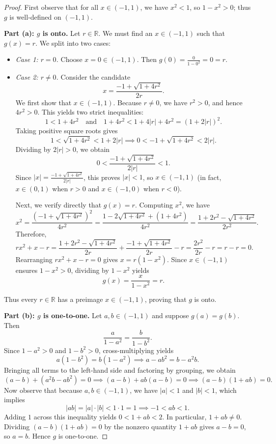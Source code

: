 \documentclass[11pt, letterpaper]{article}
\theoremstyle{definition}
\theoremstyle{remark}
\begin{document}
\begin{proof}
First observe that for all $x \in (-1, 1)$, we have $x^2 < 1$, so $1 - x^2 > 0$; thus $g$ is well-defined on $(-1, 1)$.

\textbf{Part (a): $g$ is onto.}
Let $r \in \mathbb{R}$. We must find an $x \in (-1, 1)$ such that $g(x) = r$. We split into two cases:
\begin{itemize}
    \item \emph{Case 1: $r = 0$.} Choose $x = 0 \in (-1, 1)$. Then $g(0) = \frac{0}{1 - 0^2} = 0 = r$.
    \item \emph{Case 2: $r \neq 0$.} Consider the candidate
    \[
    x = \frac{-1 + \sqrt{1 + 4r^2}}{2r}.
    \]
    We first show that $x \in (-1, 1)$. Because $r \neq 0$, we have $r^2 > 0$, and hence $4r^2 > 0$. This yields two strict inequalities:
    \[
    1 < 1 + 4r^2 \quad \text{and} \quad 1 + 4r^2 < 1 + 4|r| + 4r^2 = (1 + 2|r|)^2.
    \]
    Taking positive square roots gives
    \[
    1 < \sqrt{1 + 4r^2} < 1 + 2|r| \implies 0 < -1 + \sqrt{1 + 4r^2} < 2|r|.
    \]
    Dividing by $2|r| > 0$, we obtain
    \[
    0 < \frac{-1 + \sqrt{1 + 4r^2}}{2|r|} < 1.
    \]
    Since $|x| = \frac{-1 + \sqrt{1 + 4r^2}}{2|r|}$, this proves $|x| < 1$, so $x \in (-1, 1)$ (in fact, $x \in (0, 1)$ when $r > 0$ and $x \in (-1, 0)$ when $r < 0$).

    Next, we verify directly that $g(x) = r$. Computing $x^2$, we have
    \[
    x^2 = \frac{(-1 + \sqrt{1 + 4r^2})^2}{4r^2} = \frac{1 - 2\sqrt{1 + 4r^2} + (1 + 4r^2)}{4r^2} = \frac{1 + 2r^2 - \sqrt{1 + 4r^2}}{2r^2}.
    \]
    Therefore,
    \[
    rx^2 + x - r = \frac{1 + 2r^2 - \sqrt{1 + 4r^2}}{2r} + \frac{-1 + \sqrt{1 + 4r^2}}{2r} - r = \frac{2r^2}{2r} - r = r - r = 0.
    \]
    Rearranging $rx^2 + x - r = 0$ gives $x = r(1 - x^2)$. Since $x \in (-1, 1)$ ensures $1 - x^2 > 0$, dividing by $1 - x^2$ yields
    \[
    g(x) = \frac{x}{1 - x^2} = r.
    \]
\end{itemize}
Thus every $r \in \mathbb{R}$ has a preimage $x \in (-1, 1)$, proving that $g$ is onto.

\textbf{Part (b): $g$ is one-to-one.}
Let $a, b \in (-1, 1)$ and suppose $g(a) = g(b)$. Then
\[
\frac{a}{1 - a^2} = \frac{b}{1 - b^2}.
\]
Since $1 - a^2 > 0$ and $1 - b^2 > 0$, cross-multiplying yields
\[
a(1 - b^2) = b(1 - a^2) \implies a - ab^2 = b - a^2 b.
\]
Bringing all terms to the left-hand side and factoring by grouping, we obtain
\[
(a - b) + (a^2 b - ab^2) = 0 \implies (a - b) + ab(a - b) = 0 \implies (a - b)(1 + ab) = 0.
\]
Now observe that because $a, b \in (-1, 1)$, we have $|a| < 1$ and $|b| < 1$, which implies
\[
|ab| = |a| \cdot |b| < 1 \cdot 1 = 1 \implies -1 < ab < 1.
\]
Adding $1$ across this inequality yields $0 < 1 + ab < 2$. In particular, $1 + ab \neq 0$. Dividing $(a - b)(1 + ab) = 0$ by the nonzero quantity $1 + ab$ gives $a - b = 0$, so $a = b$. Hence $g$ is one-to-one.


\end{proof}
\end{document}
